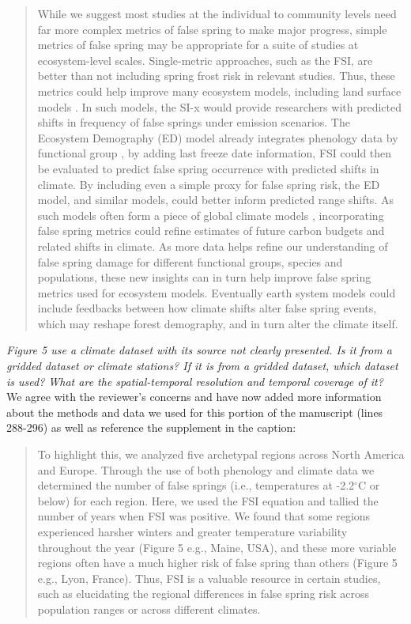 \documentclass[11pt,a4paper]{article}
\begin{document}
\begin{quotation}
While we suggest most studies at the individual to community levels need far more complex metrics of false spring to make major progress, simple metrics of false spring may be appropriate for a suite of studies at ecosystem-level scales. Single-metric approaches, such as the FSI, are better than not including spring frost risk in relevant studies. Thus, these metrics could help improve many ecosystem models, including land surface models \citep{Foley1998, Moorcroft2001, Prentice1992}. In such models, the SI-x would provide researchers with predicted shifts in frequency of false springs under emission scenarios. The Ecosystem Demography (ED) model already integrates phenology data by functional group \citep{Kim2015, Moorcroft2001}, by adding last freeze date information, FSI could then be evaluated to predict false spring occurrence with predicted shifts in climate. By including even a simple proxy for false spring risk, the ED model, and similar models, could better inform predicted range shifts. As such models often form a piece of global climate models \citep{Yu2016}, incorporating false spring metrics could refine estimates of future carbon budgets and related shifts in climate. As more data helps refine our understanding of false spring damage for different functional groups, species and populations, these new insights can in turn help improve false spring metrics used for ecosystem models. Eventually earth system models could include feedbacks between how climate shifts alter false spring events, which may reshape forest demography, and in turn alter the climate itself.
\end{quotation}

\textit{Figure 5 use a climate dataset with its source not clearly presented. Is it from a gridded dataset or climate stations? If it is from a gridded dataset, which dataset is used? What are the spatial-temporal resolution and temporal coverage of it?} \\

We agree with the reviewer's concerns and have now added more information about the methods and data we used for this portion of the manuscript (lines 288-296) as well as reference the supplement in the caption: \\

\begin{quotation}
To highlight this, we analyzed five archetypal regions across North America and Europe. Through the use of both phenology \citep{Soudani2012, Schaber2005, USA-NPN2016,  White2009} and climate data \citep[from the NOAA Climate Data Online tool][]{NOAA} we determined the number of false springs (i.e., temperatures at -2.2$^{\circ}$C or below) for each region. Here, we used the FSI equation and tallied the number of years when FSI was positive. We found that some regions experienced harsher winters and greater temperature variability throughout the year (Figure 5 e.g., Maine, USA), and these more variable regions often have a much higher risk of false spring than others (Figure 5 e.g., Lyon, France). Thus, FSI is a valuable resource in certain studies, such as elucidating the regional differences in false spring risk across population ranges or across different climates. 
\end{quotation} 
\end{document}
